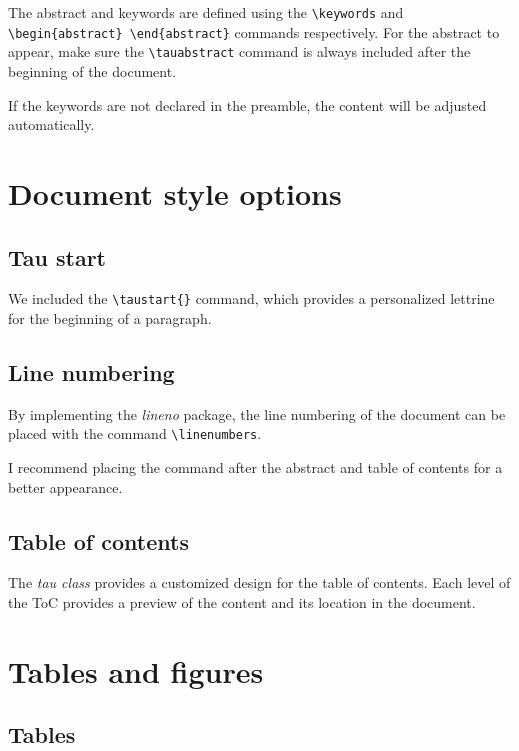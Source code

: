 \documentclass[9pt,a4paper,twocolumn,twoside]{tau-class/tau}
\begin{document}
    The abstract and keywords are defined using the \verb*|\keywords| and \verb*|\begin{abstract} \end{abstract}| commands respectively. For the abstract to appear, make sure the \verb|\tauabstract| command is always included after the beginning of the document.
    
    If the keywords are not declared in the preamble, the content will be adjusted automatically.
    
\section{Document style options}

    \subsection{Tau start}
	
        We included the \verb|\taustart{}| command, which provides a personalized lettrine for the beginning of a paragraph.

    \subsection{Line numbering}
	
        By implementing the \textit{lineno} package, the line numbering of the document can be placed with the command \verb|\linenumbers|. 
		
        I recommend placing the command after the abstract and table of contents for a better appearance.
		
    \subsection{Table of contents}
	
        The \textit{tau class} provides a customized design for the table of contents. Each level of the ToC provides a preview of the content and its location in the document. 


\section{Tables and figures}

    \subsection{Tables}
	
\end{document}
